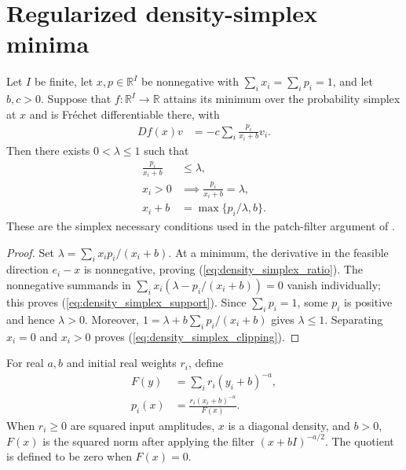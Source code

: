 \section{Regularized density-simplex minima}

\begin{theorem}
\label{thm:density_simplex_conditions}
\leanok
Let $I$ be finite, let $x,p\in\mathbb R^I$ be nonnegative with
$\sum_i x_i=\sum_i p_i=1$, and let $b,c>0$. Suppose that
$f:\mathbb R^I\to\mathbb R$ attains its minimum over the probability
simplex at $x$ and is Fr\'echet differentiable there, with
\begin{align}
 Df(x)v&=-c\sum_i\frac{p_i}{x_i+b}v_i.
 \label{eq:density_simplex_derivative}
\end{align}
Then there exists $0<\lambda\le1$ such that
\begin{align}
 \frac{p_i}{x_i+b}&\le\lambda,
 \label{eq:density_simplex_ratio}\\
 x_i>0&\implies\frac{p_i}{x_i+b}=\lambda,
 \label{eq:density_simplex_support}\\
 x_i+b&=\max\{p_i/\lambda,b\}.
 \label{eq:density_simplex_clipping}
\end{align}
These are the simplex necessary conditions used in the patch-filter
argument of \cite[Section~4]{OpenAI2026PolynomialPEPS}.
\end{theorem}
\begin{proof}
\leanok
Set $\lambda=\sum_i x_ip_i/(x_i+b)$. At a minimum, the derivative
in the feasible direction $e_i-x$ is nonnegative, proving
(\ref{eq:density_simplex_ratio}). The nonnegative summands in
$\sum_i x_i(\lambda-p_i/(x_i+b))=0$ vanish individually; this proves
(\ref{eq:density_simplex_support}). Since $\sum_i p_i=1$,
some $p_i$ is positive and hence $\lambda>0$. Moreover,
$1=\lambda+b\sum_i p_i/(x_i+b)$ gives $\lambda\le1$.
Separating $x_i=0$ and $x_i>0$ proves
(\ref{eq:density_simplex_clipping}).
\end{proof}

\begin{definition}
\label{def:density_simplex_filter}
\leanok
For real $a,b$ and initial real weights $r_i$, define
\begin{align}
 F(y)&=\sum_i r_i(y_i+b)^{-a},
 \label{eq:density_simplex_objective}\\
 p_i(x)&=\frac{r_i(x_i+b)^{-a}}{F(x)}.
 \label{eq:density_simplex_weights}
\end{align}
When $r_i\ge0$ are squared input amplitudes, $x$ is a diagonal density,
and $b>0$, $F(x)$ is the squared norm after applying
the filter $(x+bI)^{-a/2}$. The quotient is defined to be zero when
$F(x)=0$.
\end{definition}

